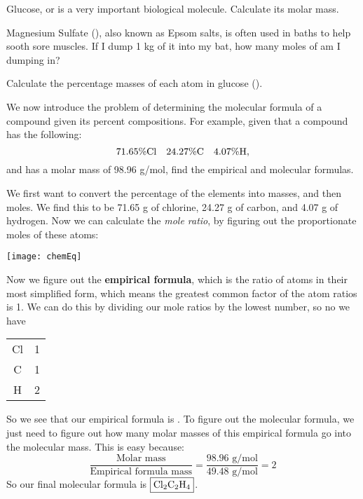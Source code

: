 \begin{problem}
Glucose, or  is a very important biological molecule. Calculate its molar mass.
\end{problem}
\begin{problem}
Magnesium Sulfate (), also known as Epsom salts, is often used in baths to help sooth sore muscles. If I dump 1 kg of it into my bat, how many moles of  am I dumping in?
\end{problem}
\begin{problem}
Calculate the percentage masses of each atom in glucose ().
\end{problem}
\begin{problem}
We now introduce the problem of determining the molecular formula of a compound given its percent compositions. For example, given that a compound has the following:
$$71.65\% \ce{ Cl} \quad 24.27 \% \ce{ C} \quad 4.07 \% \ce{ H},$$
and has a molar mass of 98.96 g/mol, find the empirical and molecular formulas.
\end{problem}
\begin{solution}
We first want to convert the percentage of the elements into masses, and then moles. We find this to be 71.65 g of chlorine, 24.27 g of carbon, and 4.07 g of hydrogen. Now we can calculate the \textit{mole ratio}, by figuring out the proportionate moles of these atoms:
\begin{center}
\texttt{[image: chemEq]}
\end{center}
Now we figure out the \textbf{empirical formula}, which is the ratio of atoms in their most simplified form, which means the greatest common factor of the atom ratios is 1. We can do this by dividing our mole ratios by the lowest number, so no we have 
\begin{center}
\begin{tabular}{c|c}
    
    Cl & 1 \\
    C & 1 \\
    H & 2 \\
    
\end{tabular}
\end{center}
So we see that our empirical formula is . To figure out the molecular formula, we just need to figure out how many molar masses of this empirical formula go into the molecular mass. This is easy because:
$$\frac{\text{Molar mass}}{\text{Empirical formula mass}} = \frac{98.96 \text{ g/mol}}{49.48 \text{ g/mol}} = 2$$
So our final molecular formula is $\boxed{\ce{Cl2C2H4}}$.
\end{solution}

